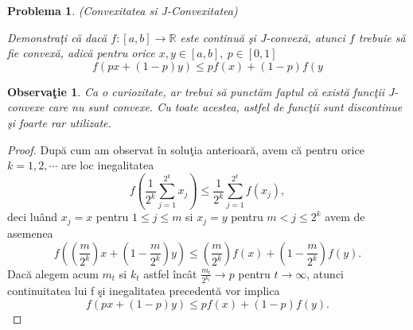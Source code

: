 \documentclass[a4paper,12pt,oneside]{report}
\newtheorem{problem}{Problema}
\newtheorem{remark}{Observa\c{t}ie}
\begin{document}
\begin{problem}  (Convexitatea si J-Convexitatea)

Demonstra\c{t}i c\u{a} dac\u{a} \(f : \left [ a,b \right ]\rightarrow \mathbb{R} \) este continu\u{a} \c{s}i J-convex\u{a}, atunci \(f\) trebuie s\u{a} fie convex\u{a}, adic\u{a} pentru orice $x, y\in [a,b],~ p\in [0,1]$
\begin{displaymath}
  f\left ( px + \left ( 1 - p \right )y \right )\leq pf\left ( x \right ) + \left ( 1-p \right )f\left ( y \right.
\end{displaymath}
\end{problem}
\begin{remark}
Ca o curiozitate, ar trebui s\u{a} punct\u{a}m faptul c\u{a} exist\u{a} func\c{t}ii J-convexe care nu sunt convexe. Cu toate acestea, astfel de func\c{t}ii sunt discontinue \c{s}i foarte rar utilizate.
\end{remark}
\begin{proof}
Dup\u{a} cum am observat \^{i}n solu\c{t}ia anterioar\u{a}, avem c\u{a} pentru orice \(k = 1,2,\cdots\) are loc inegalitatea
\begin{displaymath}
  f\left ( \frac{1}{2^{k}} \sum_{j = 1}^{2^{k}}x_{j}\right ) \leq  \frac{1}{2^{k}}\sum_{j = 1}^{2^{k}}f\left ( x_{j}\right ),
\end{displaymath}
deci lu\^{a}nd \(x_{j} = x\) pentru \(1\leq j\leq m\) si \(x_{j} = y\) pentru \(m< j\leq 2^{k}\) avem de asemenea
\begin{displaymath}
  f\left ( \left ( \frac{m}{2^{k}} \right )x + \left ( 1 - \frac{m}{2^{k}} \right )y \right )\leq \left ( \frac{m}{2^{k}} \right )f\left ( x \right ) + \left ( 1 - \frac{m}{2^{k}} \right )f\left ( y \right ).
\end{displaymath}
Dac\u{a} alegem acum \(m_{t}\) si \(k_{t}\) astfel \^{i}nc\^{a}t \(\frac{m_{t}}{2^{k_{t}}} \rightarrow p\) pentru \(t \rightarrow \infty\), atunci continuitatea lui f \c{s}i inegalitatea precedent\u{a} vor implica
\begin{displaymath}
  f\left ( px + \left ( 1 - p \right )y \right ) \leq  pf\left ( x \right ) + \left ( 1 - p \right )f\left ( y \right ).
\end{displaymath}
\end{proof}
\end{document}
